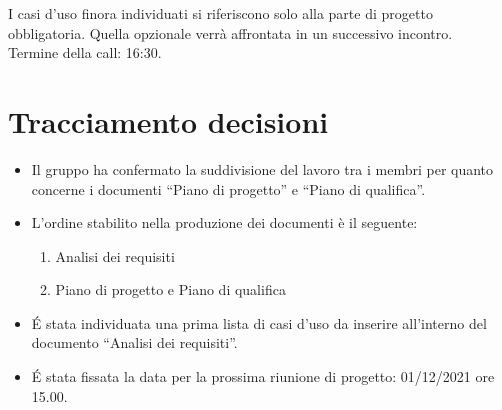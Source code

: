 \noindent I casi d'uso finora individuati si riferiscono solo alla parte di progetto obbligatoria. Quella opzionale verrà affrontata in un successivo incontro. \\

\noindent Termine della call: 16:30.

\section{Tracciamento decisioni}

\begin{itemize}
	\item Il gruppo ha confermato la suddivisione del lavoro tra i membri per quanto concerne i documenti ``Piano di progetto'' e ``Piano di qualifica''.
	\item L'ordine stabilito nella produzione dei documenti è il seguente:
		\begin{enumerate}
		\item Analisi dei requisiti
		\item Piano di progetto e Piano di qualifica
		\end{enumerate}
	\item \' E stata individuata una prima lista di casi d'uso da inserire all'interno del documento ``Analisi dei requisiti''.
	\item \' E stata fissata la data per la prossima riunione di progetto: 01/12/2021 ore 15.00.
\end{itemize}